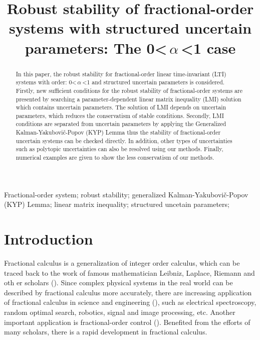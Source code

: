 \documentclass[]{interact}
\theoremstyle{plain}%
\theoremstyle{definition}
\theoremstyle{remark}
\begin{document}

\title{Robust stability of fractional-order systems with structured uncertain parameters: The 0\textless\,$\alpha$\,\textless1 case}

\author{
}

\maketitle

\begin{abstract}
\sloppy{}
In this paper, the robust stability for fractional-order linear time-invariant (LTI) systems with order: 0\textless\,$\alpha$\,\textless1 and structured uncertain parameters is considered. Firstly, new sufficient conditions for the robust stability of fractional-order systems are presented by searching a parameter-dependent linear matrix inequality (LMI) solution which contains uncertain parameters. The solution of LMI depends on uncertain parameters, which reduces the conservatism of stable conditions. Secondly, LMI conditions are separated from uncertain parameters by applying the Generalized Kalman-Yakubovi\v{c}-Popov (KYP) Lemma thus the stability of fractional-order uncertain systems can be checked directly. In addition, other types of uncertainties such as polytopic uncertainties can also be resolved using our methods. Finally, numerical examples are given to show the less conservatism of our methods. 
\end{abstract}


\begin{keywords}
	Fractional-order system; robust stability; generalized Kalman-Yakubovi\v{c}-Popov (KYP) Lemma; linear matrix inequality; structured uncetain parameters;
\end{keywords}
\section{Introduction}

\par Fractional calculus is a generalization of integer order calculus, which can be traced back to the work of famous mathematician Leibniz, Laplace, Riemann and oth er scholars (\citealp{Pod1998}). Since complex physical systems in the real world can be described by fractional calculus more accurately, there are increasing application of fractional calculus in science and engineering (\citealp{Gao2019, Sun2018, Vic2015, Veer2019}), such as electrical spectroscopy, random optimal search, robotics, signal and image processing, etc. Another important application is fractional-order control (\citealp{Azar2017, Azarmi2020, Bes2017, Choud2020, LiZ2017}). Benefited from the efforts of many scholars, there is a rapid development in fractional calculus.
\end{document}
